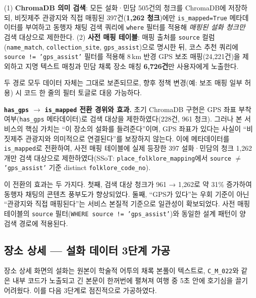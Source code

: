 \documentclass[10pt,twocolumn,a4paper]{article}
\begin{document}
(1) \textbf{ChromaDB 의미 검색}: 모든 설화·민담 505건의 청크를 ChromaDB에 저장하되,
비짓제주 관광지와 직접 매핑된 397건(\textbf{1{,}262 청크})에만 \texttt{is\_mapped=True}
메타데이터를 부여하고 동행자 채팅 검색 쿼리에 \texttt{where} 필터를 적용해
\emph{매핑된 설화 청크만} 검색 대상으로 제한한다. (2) \textbf{사전 매핑 테이블}: 매핑 출처를 \texttt{source} 컬럼
(\texttt{name\_match}, \texttt{collection\_site}, \texttt{gps\_assist})으로 명시한 뒤,
코스 추천 쿼리에 \texttt{source != 'gps\_assist'} 필터를 적용해 8\,km 반경 GPS 보조
매핑(24{,}221건)을 제외하고 지명 텍스트 매칭과 민담 채록 장소 매칭 \textbf{6{,}726건}만
사용자에게 노출한다.

두 경로 모두 데이터 자체는 그대로 보존되므로, 향후 정책 변경(예: 보조 매핑
일부 허용) 시 코드 한 줄의 필터 토글로 대응 가능하다.

\textbf{\texttt{has\_gps} $\to$ \texttt{is\_mapped} 전환 경위와 효과.}\quad
초기 ChromaDB 구현은 GPS 좌표 부착 여부(\texttt{has\_gps} 메타데이터)로 검색
대상을 제한하였다(228건, 961 청크). 그러나 본 서비스의 핵심 가치는 ``이
장소의 설화를 들려준다''이며, GPS 좌표가 있다는 사실이 ``비짓제주 관광지와
의미적으로 연결된다''를 보장하지 않는다. 이에 메타데이터를 \texttt{is\_mapped}로
전환하여, 사전 매핑 테이블에 실제 등장한 397 설화·민담의 청크 1{,}262개만
검색 대상으로 제한하였다(SSoT: \texttt{place\_folklore\_mapping}에서
\texttt{source} $\ne$ \texttt{'gps\_assist'} 기준 distinct
\texttt{folklore\_code\_no}).

이 전환의 효과는 두 가지다. 첫째, 검색 대상 청크가 961 → 1{,}262로 약 31\%
증가하여 동행자 채팅의 콘텐츠 풍부도가 향상되었다. 둘째, ``GPS가 있다''는
우회 기준이 아닌 ``관광지와 직접 매핑된다''는 서비스 본질적 기준으로
일관성이 확보되었다. 사전 매핑 테이블의 \texttt{source} 필터(\texttt{WHERE
source != 'gps\_assist'})와 동일한 설계 패턴이 양 검색 경로에 적용된다.

\subsection{장소 상세 --- 설화 데이터 3단계 가공}

장소 상세 화면의 설화는 원본이 학술적 어투의 채록 본풀이 텍스트로,
\texttt{C\_M\_022}와 같은 내부 코드가 노출되고 긴 본문이 한꺼번에 펼쳐져
여행 중 5초 안에 호기심을 끌기 어려웠다. 이를 다음 3단계로 점진적으로
가공하였다.
\end{document}
